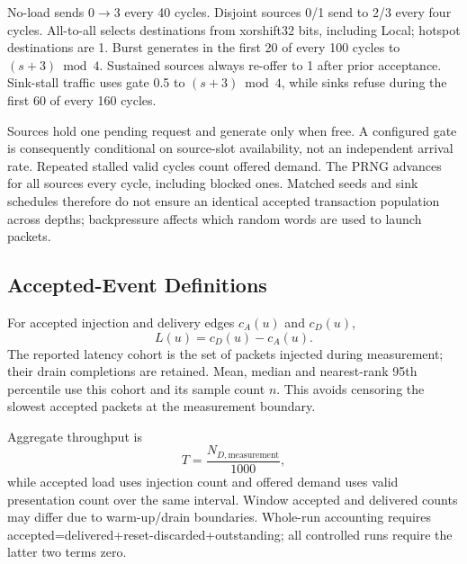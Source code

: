 \documentclass[conference,a4paper]{IEEEtran}
\begin{document}
No-load sends $0\to3$ every 40 cycles. Disjoint sources 0/1 send to 2/3 every four cycles. All-to-all selects destinations from xorshift32 bits, including Local; hotspot destinations are 1. Burst generates in the first 20 of every 100 cycles to $(s+3)\bmod4$. Sustained sources always re-offer to 1 after prior acceptance. Sink-stall traffic uses gate 0.5 to $(s+3)\bmod4$, while sinks refuse during the first 60 of every 160 cycles.

Sources hold one pending request and generate only when free. A configured gate is consequently conditional on source-slot availability, not an independent arrival rate. Repeated stalled valid cycles count offered demand. The PRNG advances for all sources every cycle, including blocked ones. Matched seeds and sink schedules therefore do not ensure an identical accepted transaction population across depths; backpressure affects which random words are used to launch packets.
\subsection{Accepted-Event Definitions}
For accepted injection and delivery edges $c_A(u)$ and $c_D(u)$,
\begin{equation}
L(u)=c_D(u)-c_A(u).
\end{equation}
The reported latency cohort is the set of packets injected during measurement; their drain completions are retained. Mean, median and nearest-rank 95th percentile use this cohort and its sample count $n$. This avoids censoring the slowest accepted packets at the measurement boundary.

Aggregate throughput is
\begin{equation}
T=\frac{N_{D,\mathrm{measurement}}}{1000},
\end{equation}
while accepted load uses injection count and offered demand uses valid presentation count over the same interval. Window accepted and delivered counts may differ due to warm-up/drain boundaries. Whole-run accounting requires accepted=delivered+reset-discarded+outstanding; all controlled runs require the latter two terms zero.
\end{document}
